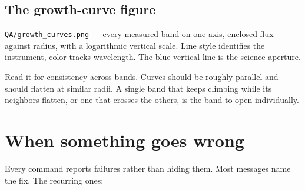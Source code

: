\documentclass[11pt]{article}
\begin{document}
\subsection{The growth-curve figure}

\texttt{QA/growth\_curves.png} --- every measured band on one axis,
enclosed flux against radius, with a logarithmic vertical scale. Line style
identifies the instrument, color tracks wavelength. The blue vertical line
is the science aperture.

Read it for consistency across bands. Curves should be roughly parallel
and should flatten at similar radii. A single band that keeps climbing
while its neighbors flatten, or one that crosses the others, is the band
to open individually.

\section{When something goes wrong}

Every command reports failures rather than hiding them. Most messages name
the fix. The recurring ones:
\end{document}
